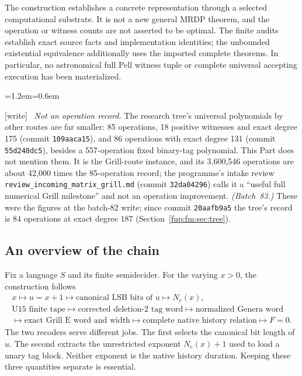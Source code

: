 \documentclass[11pt,letterpaper]{article}
\theoremstyle{definition}\newtheorem{definition}[theorem]{Definition}
\theoremstyle{remark}\newtheorem{remark}[theorem]{Remark}
\newcommand{\wtag}{\textup{[write]}}
\newenvironment{writenote}{\par\smallskip\begin{list}{}{\leftmargin=1.2em\rightmargin=0.6em}\item[]\small\wtag\ }{\end{list}\smallskip}
\newcommand{\rw}[1]{\nolinkurl{#1}}%
\begin{document}
The construction establishes a concrete representation through a selected computational substrate. It is not a new general MRDP theorem, and the operation or witness counts are not asserted to be optimal. The finite audits establish exact source facts and implementation identities; the unbounded existential equivalence additionally uses the imported complete theorems. In particular, no astronomical full Pell witness tuple or complete universal accepting execution has been materialized.
\begin{writenote}
\emph{Not an operation record.} The research tree's universal polynomials by other routes are far smaller: 85 operations, 18 positive witnesses and exact degree 175 (commit \texttt{109aaca15}), and 86 operations with exact degree 131 (commit \texttt{55d248dc5}), besides a 557-operation fixed binary-tag polynomial. This Part does not mention them. It is the Grill-route instance, and its 3,600,546 operations are about 42,000 times the 85-operation record; the programme's intake review \rw{review_incoming_matrix_grill.md} (commit \texttt{32da04296}) calls it a ``useful full numerical Grill milestone'' and not an operation improvement. \emph{(Batch~83.)} These were the figures at the batch-82 write; since commit \texttt{20aafb9a5} the tree's record is 84 operations at exact degree 187 (Section~\ref{fup:fm:sec:tree}).
\end{writenote}

\subsection{An overview of the chain}
Fix a language $S$ and its finite semidecider. For the varying $x>0$, the construction follows
\[
\begin{gathered}
x\longmapsto u=x+1\longmapsto \text{canonical LSB bits of }u\longmapsto N_e(x),\\
\text{U15 finite tape}\longmapsto\text{corrected deletion-2 tag word}
\longmapsto\text{normalized Genera word}\\
\longmapsto\text{exact Grill E word and width}\longmapsto
\text{complete native history relation}\longmapsto F=0.
\end{gathered}
\]
The two recoders serve different jobs. The first selects the canonical bit length of $u$. The second extracts the unrestricted exponent $N_e(x)+1$ used to load a unary tag block. Neither exponent is the native history duration. Keeping these three quantities separate is essential.
\end{document}
